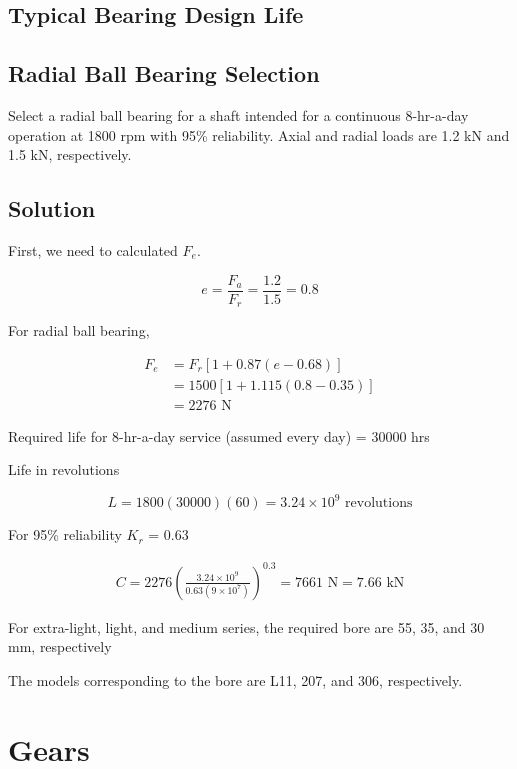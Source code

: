 \documentclass[a4paper,openany]{tufte-book}
\begin{document}
\section{Typical Bearing Design Life}
\label{sec:orge833a17}


\section{Radial Ball Bearing Selection}
\label{sec:org3ed1733}

Select a radial ball bearing for a shaft intended for a continuous
8-hr-a-day operation at 1800 rpm with 95\% reliability. Axial and radial
loads are 1.2 kN and 1.5 kN, respectively.

\section{Solution}
\label{sec:org084ce34}

First, we need to calculated \(F_e\).

\[e = \frac{F_a}{F_r} = \frac{1.2}{1.5} = 0.8\]

For radial ball bearing,

\begin{align}
  F_{e} &= F_r \left[ 1 + 0.87(e - 0.68) \right] \\
        &= 1500 \left[ 1 + 1.115(0.8 - 0.35) \right] \\
        &= 2276 \text{ N}
\end{align}

Required life for 8-hr-a-day service (assumed every day) = 30000 hrs

Life in revolutions

\[L = 1800(30000)(60) = 3.24 \times 10^9 \text{ revolutions}\]

For 95\% reliability \(K_r\) = 0.63

\begin{align}
    C = 2276 \left( \frac{3.24 \times 10^9}{0.63 (9 \times 10^7)} \right)^{0.3} = 7661 \text{ N} = 7.66 \text{ kN}
\end{align}

For extra-light, light, and medium series, the required bore are 55, 35,
and 30 mm, respectively

The models corresponding to the bore are L11, 207, and 306,
respectively.

\chapter{Gears}
\label{sec:org834acc1}
\end{document}

